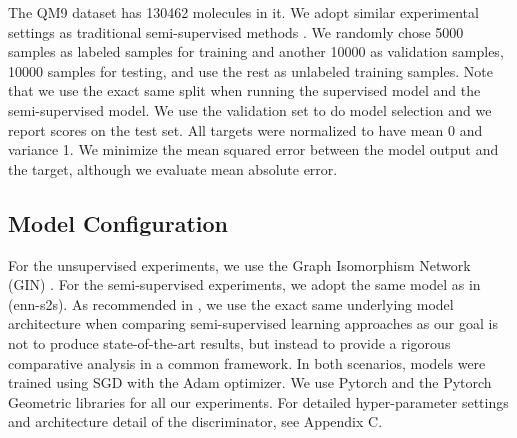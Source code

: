 \documentclass{article} \usepackage{iclr2020_conference,times}
\begin{document}
The QM9 dataset has 130462 molecules in it. We adopt similar experimental settings as traditional semi-supervised methods \cite{tarvainen2017mean,laine2016temporal,miyato2018virtual}. We randomly chose 5000 samples as labeled samples for training and another 10000 as validation samples, 10000 samples for testing, and use the rest as unlabeled training samples. Note that we use the exact same split when running the supervised model and the semi-supervised model. We use the validation set to do model selection and we report scores on the test set. All targets were normalized to have mean 0 and variance 1. We minimize the mean squared error between the model output and the target, although we evaluate mean absolute error.

\subsection{Model Configuration}
For the unsupervised experiments, we use the Graph Isomorphism Network (GIN) \cite{xu2018powerful}. For the semi-supervised experiments, we adopt the same model as in \cite{gilmer2017neural} (enn-s2s). As recommended in \cite{oliver2018realistic}, we use the exact same underlying model architecture when comparing semi-supervised learning approaches as our goal is not to produce state-of-the-art results, but instead to provide a rigorous comparative analysis in a common framework. In both scenarios, models were trained using SGD with the Adam optimizer. We use Pytorch \cite{paszke2017automatic} and the Pytorch Geometric \cite{fey2019fast} libraries for all our experiments. For detailed hyper-parameter settings and architecture detail of the discriminator, see Appendix C.
\end{document}
